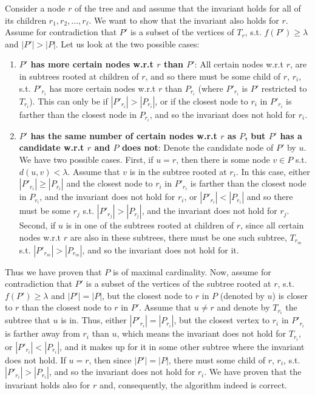 \documentclass[a4paper,UKenglish]{lipics-v2016}
\theoremstyle{plain}
\begin{document}
Consider a node $r$ of the tree and and assume that the invariant holds for all of its children $r_{1},r_{2},\ldots,r_{\ell}$.
We want to show that the invariant also holds for $r$.
Assume for contradiction that $P'$ is a subset of the vertices of $T_r$, s.t. $f(P')\geq\lambda$ and $|P'| > |P|$. Let us look at the two possible cases:
\begin{enumerate}
\item \textbf{\boldmath$P'$ has more certain nodes w.r.t \boldmath$r$ than \boldmath$P'$}: All certain nodes w.r.t $r$, are in subtrees rooted at children of $r$, and so there must be some child of $r$, $r_i$, s.t. $P'_{r_i}$ has more certain nodes w.r.t $r$ than $P_{r_i}$ (where $P'_{r_i}$ is $P'$ restricted to $T_{r_i}$). This can only be if $|P'_{r_i}| > |P_{r_i}|$, or if the closest node to $r_i$ in $P'_{r_i}$ is farther than the closest node in $P_{r_i}$, and so the invariant does not hold for $r_i$.
\item \textbf{\boldmath$P'$ has the same number of certain nodes w.r.t \boldmath$r$ as \boldmath$P$, but \boldmath$P'$ has a candidate w.r.t \boldmath$r$  and \boldmath$P$ does not}: Denote the candidate node of $P'$ by $u$. We have two possible cases. First, if $u=r$, then there is some node $v \in P$ s.t. $d(u,v)<\lambda$. Assume that $v$ is in the subtree rooted at $r_i$. In this case, either $|P'_{r_i}| \geq |P_{r_i}|$ and the closest node to $r_i$ in $P'_{r_i}$ is farther than the closest node in $P_{r_i}$, and the invariant does not hold for $r_i$, or $|P'_{r_i}|<|P_{r_i}|$ and so there must be some $r_j$ s.t. $|P'_{r_j}|>|P_{r_j}|$, and the invariant does not hold for $r_j$. Second, if $u$ is in one of the subtrees rooted at children of $r$, since all certain nodes w.r.t $r$ are also in these subtrees, there must be one such subtree, $T_{r_m}$ s.t. $|P'_{r_m}| > |P_{r_m}|$, and so the invariant does not hold for it.
\end{enumerate} 
Thus we have proven that $P$ is of maximal cardinality. Now, assume for contradiction that $P'$ is a subset of the vertices of the subtree rooted at $r$, s.t. $f(P')\geq\lambda$ and $|P'| = |P|$, but the closest node to $r$ in $P$ (denoted by $u$) is closer to $r$ than the closest node to $r$ in $P'$. Assume that $u \neq r$ and denote by $T_{r_i}$ the subtree that $u$ is in. Thus, either $|P'_{r_i}| = |P_{r_i}|$, but the closest vertex to $r_i$ in $P'_{r_i}$ is farther away from $r_i$ than $u$, which means the invariant does not hold for $T_{r_i}$, or $|P'_{r_i}| < |P_{r_i}|$, and it makes up for it in some other subtree where the invariant does not hold. If $u=r$, then since $|P'| = |P|$, there must some child of $r$, $r_i$, s.t. $|P'_{r_i}| > |P_{r_i}|$, and so the invariant does not hold for $r_i$. We have proven that the invariant holds also for $r$ and, consequently, the algorithm indeed is correct.
\end{document}
